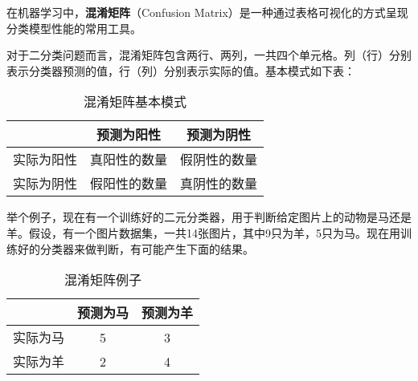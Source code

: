 
在机器学习中，\textbf{混淆矩阵}（Confusion Matrix）是一种通过表格可视化的方式呈现分类模型性能的常用工具。

对于二分类问题而言，混淆矩阵包含两行、两列，一共四个单元格。列（行）分别表示分类器预测的值，行（列）分别表示实际的值。基本模式如下表：
\begin{table}[ht]
\centering
\caption{混淆矩阵基本模式}\label{ConMat_tab1}
\begin{tabular}{|c|c|c|}
\hline
 & 预测为阳性 & 预测为阴性 \\
\hline
实际为阳性 & 真阳性的数量 & 假阴性的数量 \\
\hline
实际为阴性 & 假阳性的数量 & 真阴性的数量 \\
\hline
\end{tabular}
\end{table}
举个例子，现在有一个训练好的二元分类器，用于判断给定图片上的动物是马还是羊。假设，有一个图片数据集，一共14张图片，其中9只为羊，5只为马。现在用训练好的分类器来做判断，有可能产生下面的结果。
\begin{table}[ht]
\centering
\caption{混淆矩阵例子}\label{ConMat_tab2}
\begin{tabular}{|c|c|c|}
\hline
 & 预测为马 & 预测为羊 \\
\hline
实际为马 & 5 & 3 \\
\hline
实际为羊 & 2 & 4 \\
\hline
\end{tabular}
\end{table}